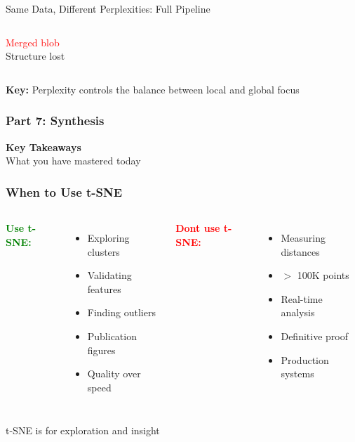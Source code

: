 \documentclass[aspectratio=169]{beamer}
\begin{document}
\begin{frame}{Same Data, Different Perplexities: Full Pipeline}
\begin{columns}
\vspace{0.3cm}

\textcolor{red}{Merged blob}\\
\tiny{Structure lost}

\end{columns}

\vspace{0.5cm}
\centering
\textbf{Key:} Perplexity controls the balance between local and global focus

\end{frame}

\begin{frame}
\frametitle{Part 7: Synthesis}

\begin{center}
\LARGE{\textbf{Key Takeaways}}\\[1cm]

What you have mastered today
\end{center}

\end{frame}

\begin{frame}
\frametitle{When to Use t-SNE}

\begin{columns}
\textbf{\textcolor{green}{Use t-SNE:}}
\begin{itemize}
\item Exploring clusters
\item Validating features
\item Finding outliers
\item Publication figures
\item Quality over speed
\end{itemize}

\textbf{\textcolor{red}{Dont use t-SNE:}}
\begin{itemize}
\item Measuring distances
\item $>$ 100K points
\item Real-time analysis
\item Definitive proof
\item Production systems
\end{itemize}
\end{columns}

\vspace{0.5cm}
\centering
\colorbox{blue!20}{t-SNE is for exploration and insight}

\end{frame}
\end{document}
